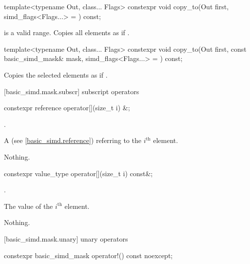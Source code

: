 \begin{itemdecl}
template<typename Out, class... Flags>
  constexpr void copy_to(Out first, simd_flags<Flags...> = {}) const;
\end{itemdecl}

\begin{itemdescr}
  \MaskStoreDescr
    {\tcode{[first, first + size())} is a valid range.}
    {Copies all  elements as if  \foralli.}
\end{itemdescr}

\begin{itemdecl}
template<typename Out, class... Flags>
  constexpr void copy_to(Out first, const basic_simd_mask& mask, simd_flags<Flags...> = {}) const;
\end{itemdecl}

\begin{itemdescr}
  \MaskStoreDescr
  {\validMaskedRange}
  {Copies the selected elements as if  \forallmaskedi.}
\end{itemdescr}

[basic_simd.mask.subscr]{ subscript operators}

\begin{itemdecl}
constexpr reference operator[](size_t i) &;
\end{itemdecl}

\begin{itemdescr}
  \pnum\expects
  .

  \pnum\returns
  A  (see \ref{basic_simd.reference}) referring to the $i^\text{th}$ element.

  \pnum\throws Nothing.
\end{itemdescr}

\begin{itemdecl}
constexpr value_type operator[](size_t i) const&;
\end{itemdecl}

\begin{itemdescr}
  \pnum\expects
  .

  \pnum\returns
  The value of the $i^\text{th}$ element.

  \pnum\throws Nothing.
\end{itemdescr}

[basic_simd.mask.unary]{ unary operators}

\begin{itemdecl}
constexpr basic_simd_mask operator!() const noexcept;
\end{itemdecl}

